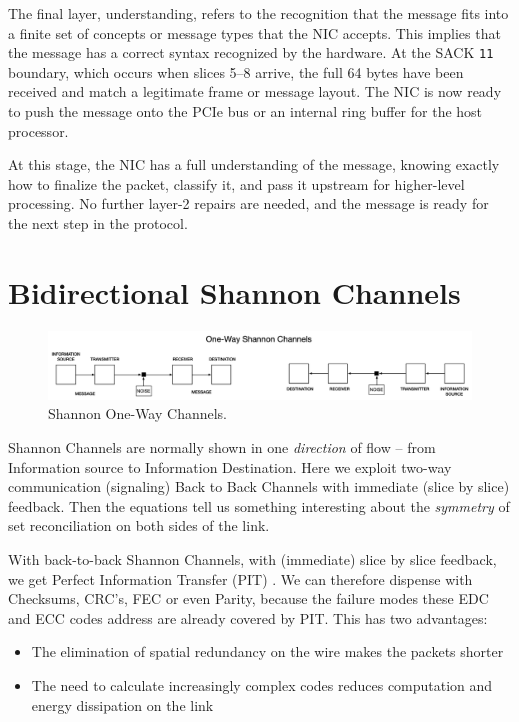 The final layer, understanding, refers to the recognition that the message fits into a finite set of concepts or message types that the NIC accepts. This implies that the message has a correct syntax recognized by the hardware. At the SACK \texttt{11} boundary, which occurs when slices 5–8 arrive, the full 64 bytes have been received and match a legitimate frame or message layout. The NIC is now ready to push the message onto the PCIe bus or an internal ring buffer for the host processor.

At this stage, the NIC has a full understanding of the message, knowing exactly how to finalize the packet, classify it, and pass it upstream for higher-level processing. No further layer-2 repairs are needed, and the message is ready for the next step in the protocol.

\section{Bidirectional Shannon Channels}

\begin{figure}
\includegraphics[width=\textwidth]{./figures/One-Way-Shannon.png}
  \caption{Shannon One-Way Channels. }
\end{figure}

Shannon Channels are normally shown in one \emph{direction} of flow -- from Information source to Information Destination. Here we exploit two-way communication (signaling) Back to Back Channels with immediate (slice by slice) feedback. Then the equations tell us something interesting about the \emph{symmetry} of set reconciliation on both sides of the link.

With back-to-back Shannon Channels, with (immediate) slice by slice feedback, we get Perfect Information Transfer (PIT) \cite{soltted-aloha}. We can therefore dispense with Checksums, CRC's, FEC or even Parity,  because the failure modes these EDC and ECC codes address are already covered by PIT.  This has two advantages:

\begin{itemize}
\item The elimination of spatial redundancy on the wire makes the packets shorter
\item The need to calculate increasingly complex codes reduces computation and energy dissipation on the link
\end{itemize}

